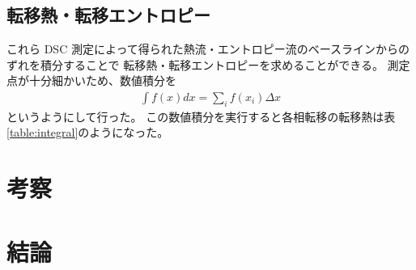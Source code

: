 \documentclass[9pt,dvipdfmx,a4paper]{jsarticle}
\begin{document}
\subsection{転移熱・転移エントロピー}
これら DSC 測定によって得られた熱流・エントロピー流のベースラインからのずれを積分することで
転移熱・転移エントロピーを求めることができる。
測定点が十分細かいため、数値積分を
\begin{align}
    \int f(x)dx = \sum_{i} f(x_i)\Delta x
\end{align}
というようにして行った。
この数値積分を実行すると各相転移の転移熱は表\ref{table:integral}のようになった。

\section{考察}


\section{結論}




\nocite{*}

\appendix
\end{document}
